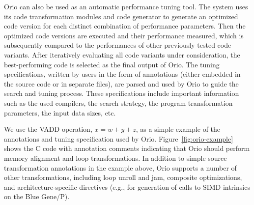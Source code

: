 \documentclass[11pt]{article}
\begin{document}
Orio can also be used as an automatic performance tuning tool. The system uses its code transformation modules and code generator to generate an optimized code version for each distinct combination of performance parameters. Then the optimized code versions are executed and their performance measured, which is subsequently compared to the performances of other previously tested code variants. After iteratively evaluating all code variants under consideration, the best-performing code is selected as the final output of Orio. The tuning specifications, written by users in the form of annotations (either embedded in the source code or in separate files), are parsed and used by Orio to guide the search and tuning process. These specifications include important information such as the used compilers, the search strategy, the program transformation parameters, the input data sizes, etc.

We use the VADD operation, $x = w + y + z$, as a simple example of the annotations and tuning specification used by Orio. Figure~\ref{fig:orio-example} shows the C code with annotation comments indicating that Orio should perform memory alignment and loop transformations. In addition to simple source transformation annotations in the example above, Orio supports a number of other transformations, including loop unroll and jam, composite optimizations, and architecture-specific directives (e.g., for generation of calls to SIMD intrinsics on the Blue Gene/P).
\end{document}
